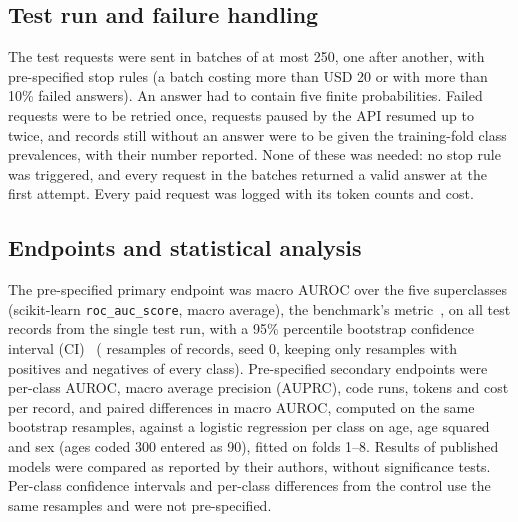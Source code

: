 \subsection{Test run and failure handling}
The \NTest{} test requests were sent in \NBatches{} batches of at most 250, one after another, with pre-specified stop
rules (a batch costing more than USD 20 or with more than 10\% failed answers). An answer had to contain five finite
probabilities. Failed requests were to be retried once, requests paused by the API resumed up to twice, and records
still without an answer were to be given the training-fold class prevalences, with their number reported. None of
these was needed: no stop rule was triggered, and every request in the \NBatches{} batches returned a valid answer at
the first attempt. Every paid request was logged with its token counts and cost.

\subsection{Endpoints and statistical analysis}\label{sec:endpoints}
The pre-specified primary endpoint was macro AUROC over the five superclasses (scikit-learn \texttt{roc\_auc\_score},
macro average), the benchmark's metric~\citep{Strodthoff2021}, on all \NTest{} test records from the single test
run, with a 95\% percentile bootstrap confidence interval (CI)~\citep{Efron1993} (\NBoot{} resamples of records, seed 0,
keeping only resamples with positives and negatives of every class). Pre-specified secondary endpoints were per-class
AUROC, macro average precision (AUPRC), code runs, tokens and cost per record, and paired differences in macro AUROC,
computed on the same bootstrap resamples, against a logistic regression per class on age, age squared and sex (ages
coded 300 entered as 90), fitted on folds 1--8. Results of published models were compared as reported
by their authors, without significance tests. Per-class confidence intervals and per-class differences from the control use the same resamples and were not
pre-specified.

